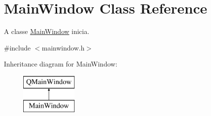 \hypertarget{class_main_window}{}\section{Main\+Window Class Reference}
\label{class_main_window}


A classe \mbox{\hyperlink{class_main_window}{Main\+Window}} inicia.  




{\ttfamily \#include $<$mainwindow.\+h$>$}

Inheritance diagram for Main\+Window\+:\begin{figure}[H]
\begin{center}
\leavevmode
\includegraphics[height=2.000000cm]{class_main_window}
\end{center}
\end{figure}

